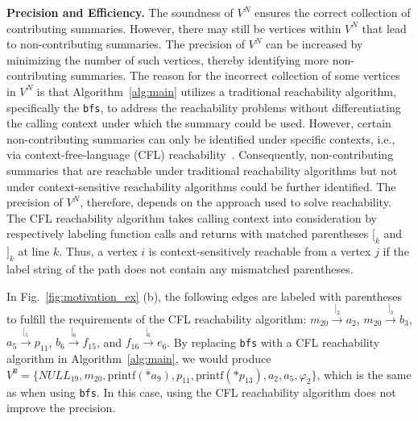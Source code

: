\textbf{Precision and Efficiency.}
The soundness of $V^{N}$ ensures the correct collection of contributing summaries. 
However, there may still be vertices within $V^{N}$ that lead to non-contributing summaries. 
The precision of $V^{N}$ can be increased by minimizing the number of such vertices, thereby identifying more non-contributing summaries.
The reason for the incorrect collection of some vertices in $V^{N}$ is that Algorithm~\ref{alg:main} utilizes a traditional reachability algorithm, specifically the \texttt{bfs}, to address the reachability problems without differentiating the calling context under which the summary could be used.
However, certain non-contributing summaries can only be identified under specific contexts, i.e., via context-free-language (CFL) reachability~\cite{reps1994speeding, reps1995shape, kodumal2004set, chaudhuri2008subcubic, yannakakis1990graph, melski2000interconvertibility}.
Consequently, non-contributing summaries that are reachable under traditional reachability algorithms but not under context-sensitive reachability algorithms could be further identified. 
The precision of $V^{N}$, therefore, depends on the approach used to solve reachability.
The CFL reachability algorithm takes calling context into consideration by respectively labeling function calls and returns with matched parentheses \([_k\) and \(]_k\) at line $k$.
Thus, a vertex \(i\) is context-sensitively reachable from a vertex \(j\) if the label string of the path does not contain any mismatched parentheses.

\begin{example}
In Fig.~\ref{fig:motivation_ex} (b), the following edges are labeled with parentheses to fulfill the requirements of the CFL reachability algorithm:
$m_{20} \xrightarrow{]_2} a_{2}$, $m_{20} \xrightarrow{]_3} b_{3}$,
$a_{5} \xrightarrow{[_5} p_{11}$, $b_{6} \xrightarrow{[_6} f_{15}$, and $f_{16} \xrightarrow{]_6} e_{6}$.
By replacing \texttt{bfs} with a CFL reachability algorithm in Algorithm~\ref{alg:main}, we would produce $V^{\texttt{N}} = \{NULL_{19}, m_{20}, \text{printf}(*a_9), p_{11}, \text{printf}(*p_{13}), a_2, a_5, \varphi_2 \}$, which is the same as when using \texttt{bfs}. 
In this case, using the CFL reachability algorithm does not improve the precision.
\end{example}

